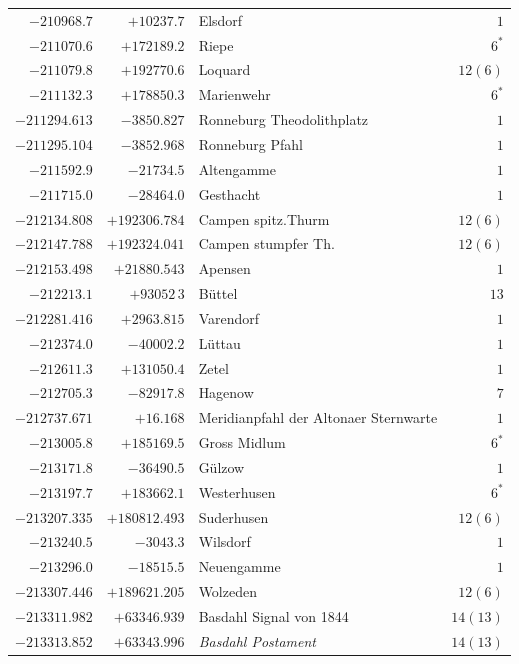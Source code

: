\begin{center}
\begin{tabular}{r|r|p{170pt}|r}
\(-210968.7\)&\(+10237.7\)&Elsdorf&\(1\)\\
\(-211070.6\)&\(+172189.2\)&Riepe&\(6^{*}\)\\
\(-211079.8\)&\(+192770.6\)&Loquard&\(12 (6)\)\\
\(-211132.3\)&\(+178850.3\)&Marienwehr&\(6^{*}\)\\
\(-211294.613\)&\(-3850.827\)&Ronneburg Theodolithplatz&\(1\)\\
\(-211295.104\)&\(-3852.968\)&Ronneburg Pfahl&\(1\)\\
\(-211592.9\)&\(-21734.5\)&Altengamme&\(1\)\\
\(-211715.0\)&\(-28464.0\)&Gesthacht&\(1\)\\
\(-212134.808\)&\(+192306.784\)&Campen spitz.Thurm&\(12 (6)\)\\
\(-212147.788\)&\(+192324.041\)&Campen stumpfer Th.&\(12 (6)\)\\
\(-212153.498\)&\(+21880.543\)&Apensen&\(1\)\\
\(-212213.1\)&\(+93052\,3\)&Büttel&\(13\)\\
\(-212281.416\)&\(+2963.815\)&Varendorf&\(1\)\\
\(-212374.0\)&\(-40002.2\)&Lüttau&\(1\)\\
\(-212611.3\)&\(+131050.4\)&Zetel&\(1\)\\
\(-212705.3\)&\(-82917.8\)&Hagenow&\(7\)\\
\(-212737.671\)&\(+16.168\)&Meridianpfahl der Altonaer Sternwarte&\(1\)\\
\(-213005.8\)&\(+185169.5\)&Gross Midlum&\(6^{*}\)\\
\(-213171.8\)&\(-36490.5\)&Gülzow&\(1\)\\
\(-213197.7\)&\(+183662.1\)&Westerhusen&\(6^{*}\)\\
\(-213207.335\)&\(+180812.493\)&Suderhusen&\(12 (6)\)\\
\(-213240.5\)&\(-3043.3\)&Wilsdorf&\(1\)\\
\(-213296.0\)&\(-18515.5\)&Neuengamme&\(1\)\\
\(-213307.446\)&\(+189621.205\)&Wolzeden&\(12 (6)\)\\
\(-213311.982\)&\(+63346.939\)&Basdahl Signal von 1844&\(14(13)\)\\
\(-213313.852\)&\(+63343.996\)&\textit{Basdahl Postament}&\(14(13)\)\\
\hline\end{tabular}\endgroup\end{center}
